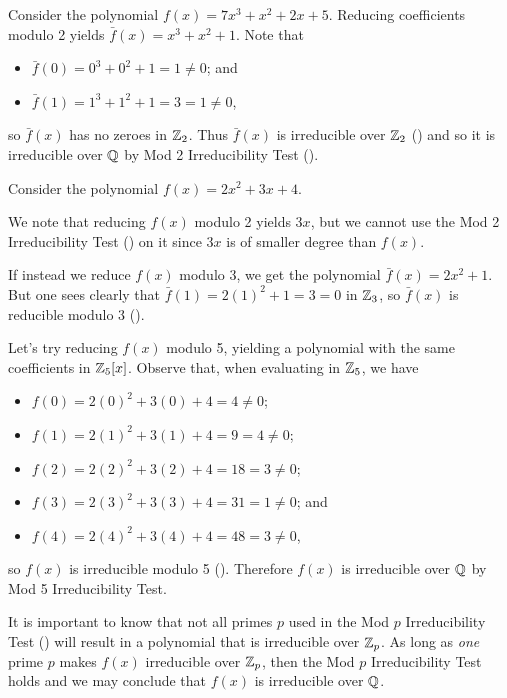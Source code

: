 \begin{example}
    Consider the polynomial $f(x) = 7x^3 + x^2 + 2x + 5$. Reducing coefficients modulo 2 yields $\bar{f}(x) = x^3 + x^2 + 1$. Note that
    \begin{itemize}
        \item $\bar{f}(0) = 0^3 + 0^2 + 1 = 1 \neq 0$; and
        \item $\bar{f}(1) = 1^3 + 1^2 + 1 = 3 = 1 \neq 0$,
    \end{itemize}
    so $\bar{f}(x)$ has no zeroes in $\mathbb{Z}_2$. Thus $\bar{f}(x)$ is irreducible over $\mathbb{Z}_2$ () and so it is irreducible over $\mathbb{Q}$ by Mod 2 Irreducibility Test ().
\end{example}
\begin{example}
    Consider the polynomial $f(x) = 2x^2 + 3x + 4$.

    We note that reducing $f(x)$ modulo 2 yields $3x$, but we cannot use the Mod 2 Irreducibility Test () on it since $3x$ is of smaller degree than $f(x)$.

    If instead we reduce $f(x)$ modulo 3, we get the polynomial $\bar{f}(x) = 2x^2 + 1$. But one sees clearly that $\bar{f}(1) = 2(1)^2 + 1 = 3 = 0$ in $\mathbb{Z}_3$, so $\bar{f}(x)$ is reducible modulo 3 ().

    Let's try reducing $f(x)$ modulo 5, yielding a polynomial with the same coefficients in $\mathbb{Z}_5[x]$. Observe that, when evaluating in $\mathbb{Z}_5$, we have
    \begin{itemize}
        \item $f(0) = 2(0)^2 + 3(0) + 4 = 4 \neq 0$;
        \item $f(1) = 2(1)^2 + 3(1) + 4 = 9 = 4 \neq 0$;
        \item $f(2) = 2(2)^2 + 3(2) + 4 = 18 = 3 \neq 0$;
        \item $f(3) = 2(3)^2 + 3(3) + 4 = 31 = 1 \neq 0$; and
        \item $f(4) = 2(4)^2 + 3(4) + 4 = 48 = 3 \neq 0$,
    \end{itemize}
    so $f(x)$ is irreducible modulo 5 (). Therefore $f(x)$ is irreducible over $\mathbb{Q}$ by Mod 5 Irreducibility Test.
\end{example}

It is important to know that not all primes $p$ used in the Mod $p$ Irreducibility Test () will result in a polynomial that is irreducible over $\mathbb{Z}_p$. As long as \textit{one} prime $p$ makes $f(x)$ irreducible over $\mathbb{Z}_p$, then the Mod $p$ Irreducibility Test holds and we may conclude that $f(x)$ is irreducible over $\mathbb{Q}$.

